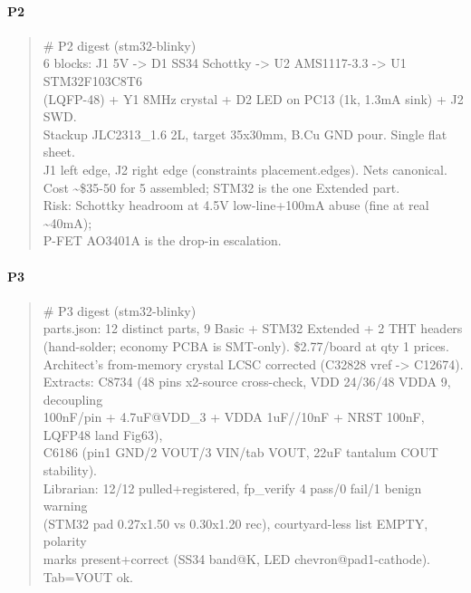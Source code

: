 \documentclass[11pt,a4paper]{article}
\begin{document}
\paragraph*{P2}
\begin{quote}\small\ttfamily\raggedright
\# P2 digest (stm32-blinky)\\
6 blocks: J1 5V -\textgreater{} D1 SS34 Schottky -\textgreater{} U2 AMS1117-3.3 -\textgreater{} U1 STM32F103C8T6\\
(LQFP-48) + Y1 8MHz crystal + D2 LED on PC13 (1k, 1.3mA sink) + J2 SWD.\\
Stackup JLC2313\_1.6 2L, target 35x30mm, B.Cu GND pour. Single flat sheet.\\
J1 left edge, J2 right edge (constraints placement.edges). Nets canonical.\\
Cost \textasciitilde{}\$35-50 for 5 assembled; STM32 is the one Extended part.\\
Risk: Schottky headroom at 4.5V low-line+100mA abuse (fine at real \textasciitilde{}40mA);\\
P-FET AO3401A is the drop-in escalation.
\end{quote}
\paragraph*{P3}
\begin{quote}\small\ttfamily\raggedright
\# P3 digest (stm32-blinky)\\
parts.json: 12 distinct parts, 9 Basic + STM32 Extended + 2 THT headers\\
(hand-solder; economy PCBA is SMT-only). \$2.77/board at qty 1 prices.\\
Architect's from-memory crystal LCSC corrected (C32828 vref -\textgreater{} C12674).\\
Extracts: C8734 (48 pins x2-source cross-check, VDD 24/36/48 VDDA 9, decoupling\\
100nF/pin + 4.7uF@VDD\_3 + VDDA 1uF//10nF + NRST 100nF, LQFP48 land Fig63),\\
C6186 (pin1 GND/2 VOUT/3 VIN/tab VOUT, 22uF tantalum COUT stability).\\
Librarian: 12/12 pulled+registered, fp\_verify 4 pass/0 fail/1 benign warning\\
(STM32 pad 0.27x1.50 vs 0.30x1.20 rec), courtyard-less list EMPTY, polarity\\
marks present+correct (SS34 band@K, LED chevron@pad1-cathode). Tab=VOUT ok.
\end{quote}
\end{document}

